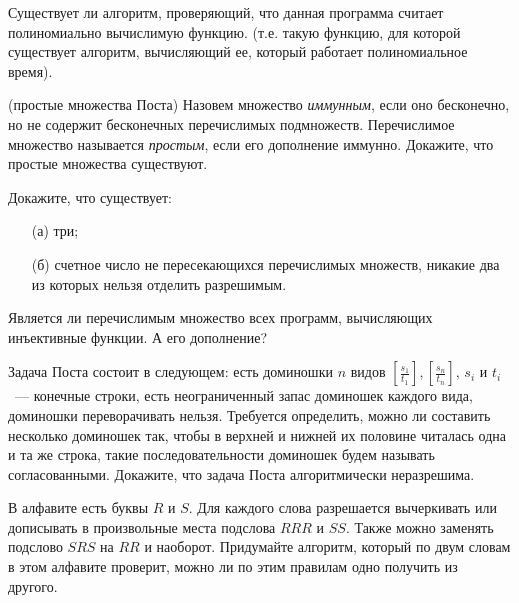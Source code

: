 \setcounter{curtask}{17}


\newcommand{\dom}[2]{\left[\frac{#1}{#2}\right]}

\begin{task}
    Существует ли алгоритм, проверяющий, что данная программа считает полиномиально вычислимую функцию. (т.е. такую функцию, для
    которой существует алгоритм, вычисляющий ее, который работает полиномиальное время).
\end{task}

\begin{task} (простые множества Поста)
    Назовем множество {\it иммунным}, если оно бесконечно, но не содержит бесконечных перечислимых подмножеств. Перечислимое
    множество называется {\it простым}, если его дополнение иммунно. Докажите, что простые множества существуют.
\end{task}

\begin{task}
    Докажите, что существует: 
    \begin{enumerate}
        \setlength\itemsep{0cm}
        \item[(а)] три;
        \item[(б)] счетное число не пересекающихся перечислимых множеств, никакие два из которых нельзя отделить разрешимым.
    \end{enumerate}
\end{task}

\begin{task}
    Является ли перечислимым множество всех программ, вычисляющих инъективные функции. А его дополнение?
\end{task}

\begin{task}
	Задача Поста состоит в следующем: есть доминошки $n$ видов $\dom{s_1}{t_1}, \dom{s_n}{t_n}$, $s_i$ и $t_i$~--- конечные
    строки, есть неограниченный запас доминошек каждого вида, доминошки переворачивать нельзя. Требуется определить, можно ли
    составить несколько доминошек так, чтобы в верхней и нижней их половине читалась одна и та же строка, такие последовательности
    доминошек будем называть согласованными. Докажите, что задача Поста алгоритмически неразрешима.
\end{task}

\begin{task}
	В алфавите есть буквы $R$ и $S$. Для каждого слова разрешается вычеркивать или дописывать в произвольные места подслова $RRR$
    и $SS$. Также можно заменять подслово $SRS$ на $RR$ и наоборот. Придумайте алгоритм, который по двум словам в этом алфавите
    проверит, можно ли по этим правилам одно получить из другого.
\end{task}


